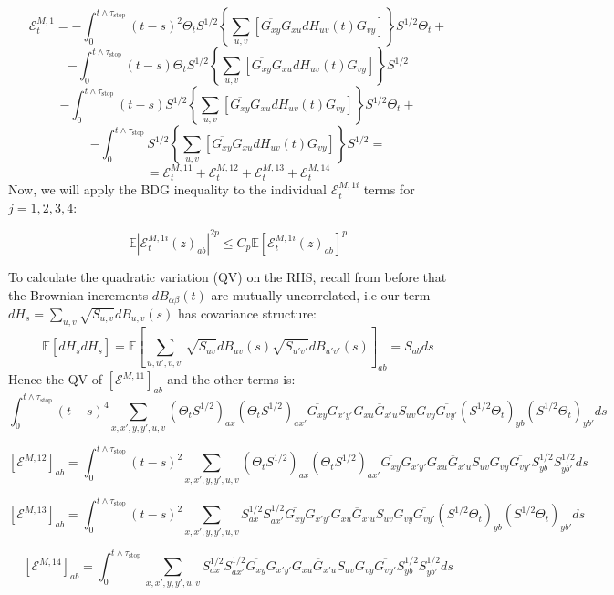 \documentclass[11pt]{article}
\newcommand{\sto}{\text{stop}}
\begin{document}
$$\mathcal{E}_t^{M, 1} = -\int_0^{t\wedge \tau_\sto}(t-s)^2\Theta_tS^{1/2}\left\{\sum_{u, v}\left[\overline{G_{xy}}G_{xu}dH_{uv}(t)G_{vy}\right]\right\}S^{1/2}\Theta_t+$$
$$-\int_0^{t\wedge \tau_\sto}(t-s)\Theta_tS^{1/2}\left\{\sum_{u, v}\left[\overline{G_{xy}}G_{xu}dH_{uv}(t)G_{vy}\right]\right\}S^{1/2}$$
$$-\int_0^{t\wedge \tau_\sto}(t-s)S^{1/2}\left\{\sum_{u, v}\left[\overline{G_{xy}}G_{xu}dH_{uv}(t)G_{vy}\right]\right\}S^{1/2}\Theta_t+$$
$$-\int_0^{t\wedge \tau_\sto}S^{1/2}\left\{\sum_{u, v}\left[\overline{G_{xy}}G_{xu}dH_{uv}(t)G_{vy}\right]\right\}S^{1/2} =$$
$$= \mathcal{E}_t^{M, 11}+\mathcal{E}_t^{M, 12}+\mathcal{E}_t^{M, 13}+\mathcal{E}_t^{M, 14}$$
Now, we will apply the BDG inequality to the individual $\mathcal{E}_t^{M, 1i}$ terms for $j=1, 2, 3, 4$:

\begin{equation*}\mathbb{E}\left\vert \mathcal{E}^{M, 1i}_t(z)_{ab}\right\vert^{2p}\leq C_p\mathbb{E}\left[ \mathcal{E}^{M, 1i}_t(z)_{ab} \right]^p\tag{6.3}\end{equation*}


\noindent To calculate the quadratic variation (QV) on the RHS, recall from before that the Brownian increments $dB_{\alpha\beta}(t)$ are mutually uncorrelated, i.e our term $dH_s = \sum_{u, v} \sqrt{S_{u, v}}dB_{u, v}(s)$ has covariance structure: $$\mathbb{E}\left[dH_s\overline{dH_s}\right] = \mathbb{E}\left[\sum_{u, u', v, v'}\sqrt{S_{uv}}dB_{uv}(s)\sqrt{S_{u'v'}}dB_{u'v'}(s)\right]_{ab}=S_{ab}ds$$
Hence the QV of $\left[\mathcal{E}^{M, 11}\right]_{ab}$ and the other terms is:
$$ \int_0^{t\wedge \tau_\sto}(t-s)^4\sum_{x, x', y, y', u, v}(\Theta_tS^{1/2})_{ax}(\Theta_tS^{1/2})_{ax'}\overline{G_{xy}}G_{x'y'}G_{xu}\overline{G}_{x'u}S_{uv}G_{vy}\overline{G_{vy'}}(S^{1/2}\Theta_t)_{yb}(S^{1/2}\Theta_t)_{yb'}ds$$

$$\left[\mathcal{E}^{M, 12}\right]_{ab} = \int_0^{t\wedge \tau_\sto}(t-s)^2\sum_{x, x', y, y', u, v}(\Theta_tS^{1/2})_{ax}(\Theta_tS^{1/2})_{ax'}\overline{G_{xy}}G_{x'y'}G_{xu}\overline{G}_{x'u}S_{uv}G_{vy}\overline{G_{vy'}}S^{1/2}_{yb}S^{1/2}_{yb'}ds$$

$$\left[\mathcal{E}^{M, 13}\right]_{ab} = \int_0^{t\wedge \tau_\sto}(t-s)^2\sum_{x, x', y, y', u, v}S^{1/2}_{ax}S^{1/2}_{ax'}\overline{G_{xy}}G_{x'y'}G_{xu}\overline{G}_{x'u}S_{uv}G_{vy}\overline{G_{vy'}}(S^{1/2}\Theta_t)_{yb}(S^{1/2}\Theta_t)_{yb'}ds$$

$$\left[\mathcal{E}^{M, 14}\right]_{ab} = \int_0^{t\wedge \tau_\sto}\sum_{x, x', y, y', u, v}S^{1/2}_{ax}S^{1/2}_{ax'}\overline{G_{xy}}G_{x'y'}G_{xu}\overline{G}_{x'u}S_{uv}G_{vy}\overline{G_{vy'}}S^{1/2}_{yb}S^{1/2}_{yb'}ds$$
\end{document}
